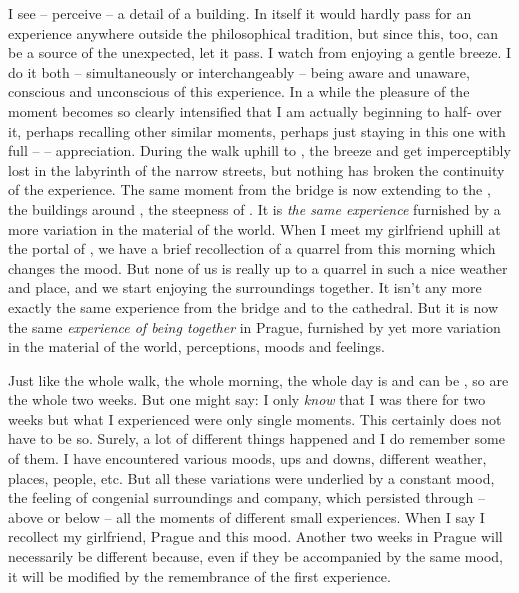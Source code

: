 I see -- perceive -- a detail of a building. In itself it would hardly pass for
an experience anywhere outside the philosophical tradition, but since this, too,
can be a source of the unexpected, let it pass.  I watch  from   enjoying a gentle breeze. I do it both --
simultaneously or interchangeably -- being aware and unaware, conscious and
unconscious of 
this experience. In a while the pleasure of the moment becomes so clearly
intensified that I am actually beginning to half- over it, perhaps
recalling other similar moments, perhaps just staying in this one with full --
 -- appreciation. During the walk uphill to , the
breeze and  get imperceptibly lost in the labyrinth of the narrow
streets, but nothing has broken the continuity of the experience. The same
moment from the bridge is now extending to the 
, the buildings around , the steepness of .  It is {\em
  the same experience} furnished by a more variation in the material of the
world. When I meet my girlfriend uphill at the portal of , 
we have a brief recollection of a quarrel from this morning which changes the
mood. But none of us is really up to a quarrel in such a nice weather and
place, and we start enjoying the surroundings together. It isn't any more exactly the
same experience from the bridge and to the cathedral. But it is
now the same {\em experience of being together} in Prague, furnished by yet more
variation in the material of the world, perceptions, moods and feelings.

\pa Just like the whole walk, the whole morning, the whole day
is  and can be , so are the whole two weeks.
But one might say: I only {\em know} that I was there for two weeks but what I
experienced were only single moments. This certainly does not have to be so.
Surely, a lot of different things happened and I do remember some of them. I
have encountered various moods, ups and downs, different weather, places, people, etc.
But all these variations were underlied by a constant mood, the feeling of
congenial surroundings and company, which persisted through -- above or below --
all the moments of different small experiences. When I say  I recollect my girlfriend, Prague and this mood.
Another two weeks in Prague will necessarily be different because, even if they
be accompanied by the same mood, it will be modified by the remembrance of the
first experience.

